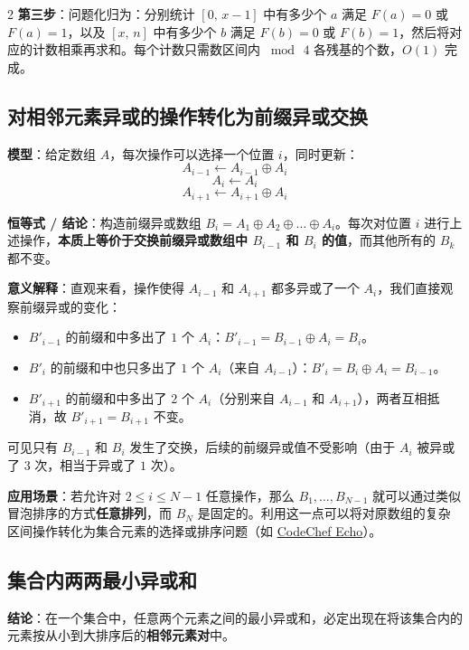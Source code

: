 \begin{multicols*}{2}
		\textbf{第三步}：问题化归为：分别统计 $[0,\, x-1]$ 中有多少个 $a$ 满足 $F(a) = 0$ 或 $F(a) = 1$，以及 $[x,\, n]$ 中有多少个 $b$ 满足 $F(b) = 0$ 或 $F(b) = 1$，然后将对应的计数相乘再求和。每个计数只需数区间内 $\bmod\, 4$ 各残基的个数，$O(1)$ 完成。

		\subsection{对相邻元素异或的操作转化为前缀异或交换}
		\textbf{模型}：给定数组 $A$，每次操作可以选择一个位置 $i$，同时更新：
		$$A_{i-1} \leftarrow A_{i-1} \oplus A_i$$
		$$A_i \leftarrow A_i$$
		$$A_{i+1} \leftarrow A_{i+1} \oplus A_i$$

		\textbf{恒等式 / 结论}：构造前缀异或数组 $B_i = A_1 \oplus A_2 \oplus \dots \oplus A_i$。每次对位置 $i$ 进行上述操作，\textbf{本质上等价于交换前缀异或数组中 $B_{i-1}$ 和 $B_i$ 的值}，而其他所有的 $B_k$ 都不变。

		\textbf{意义解释}：直观来看，操作使得 $A_{i-1}$ 和 $A_{i+1}$ 都多异或了一个 $A_i$，我们直接观察前缀异或的变化：
		\begin{itemize}
			\item $B'_{i-1}$ 的前缀和中多出了 $1$ 个 $A_i$：$B'_{i-1} = B_{i-1} \oplus A_i = B_i$。
			\item $B'_i$ 的前缀和中也只多出了 $1$ 个 $A_i$（来自 $A_{i-1}$）：$B'_i = B_i \oplus A_i = B_{i-1}$。
			\item $B'_{i+1}$ 的前缀和中多出了 $2$ 个 $A_i$（分别来自 $A_{i-1}$ 和 $A_{i+1}$），两者互相抵消，故 $B'_{i+1} = B_{i+1}$ 不变。
		\end{itemize}
		可见只有 $B_{i-1}$ 和 $B_i$ 发生了交换，后续的前缀异或值不受影响（由于 $A_i$ 被异或了 $3$ 次，相当于异或了 $1$ 次）。

		\textbf{应用场景}：若允许对 $2 \le i \le N-1$ 任意操作，那么 $B_1, \dots, B_{N-1}$ 就可以通过类似冒泡排序的方式\textbf{任意排列}，而 $B_N$ 是固定的。利用这一点可以将对原数组的复杂区间操作转化为集合元素的选择或排序问题（如 \href{https://www.codechef.com/START235B/problems/P6235?tab=statement}{CodeChef Echo}）。

		\subsection{集合内两两最小异或和}
		\textbf{结论}：在一个集合中，任意两个元素之间的最小异或和，必定出现在将该集合内的元素按从小到大排序后的\textbf{相邻元素对}中。


\end{multicols*}
